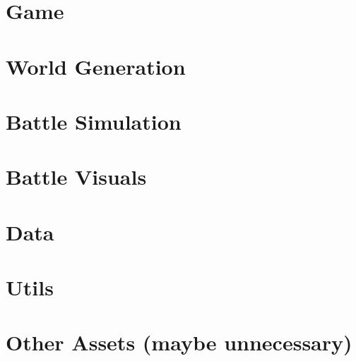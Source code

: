 \section{Game}\label{sec:docs-game}

\section{World Generation}\label{sec:docs-worldgen}

\section{Battle Simulation}\label{sec:docs-sim}

\section{Battle Visuals}\label{sec:docs-vis}

\section{Data}\label{sec:docs-data}

\section{Utils}\label{sec:docs-utils}

\section{Other Assets (maybe unnecessary)}
